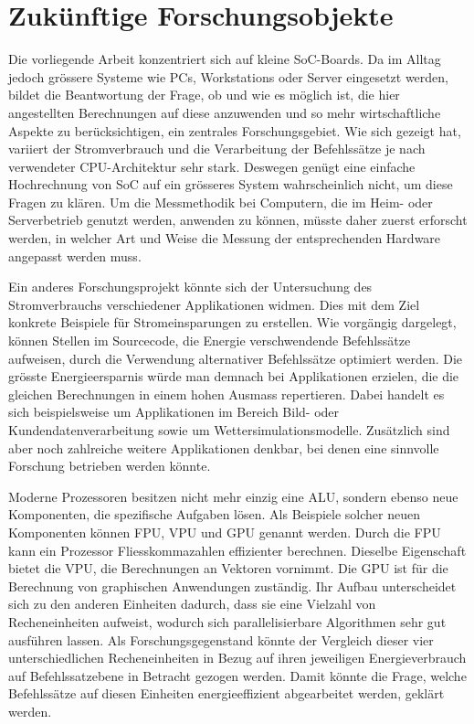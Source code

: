 \section{Zukünftige Forschungsobjekte}
Die vorliegende Arbeit konzentriert sich auf kleine SoC-Boards. Da im Alltag jedoch grössere Systeme wie PCs, Workstations oder Server eingesetzt werden, bildet die Beantwortung der Frage, ob und wie es möglich ist, die hier angestellten Berechnungen auf diese anzuwenden und so mehr wirtschaftliche Aspekte zu berücksichtigen, ein zentrales Forschungsgebiet. Wie sich gezeigt hat, variiert der Stromverbrauch und die Verarbeitung der Befehlssätze je nach verwendeter CPU-Architektur sehr stark. Deswegen genügt eine einfache Hochrechnung von SoC auf ein grösseres System wahrscheinlich nicht, um diese Fragen zu klären. Um die Messmethodik bei Computern, die im Heim- oder Serverbetrieb genutzt werden, anwenden zu können, müsste daher zuerst erforscht werden, in welcher Art und Weise die Messung der entsprechenden Hardware angepasst werden muss.
\par
Ein anderes Forschungsprojekt könnte sich der Untersuchung des Stromverbrauchs verschiedener Applikationen widmen. Dies mit dem Ziel konkrete Beispiele für Stromeinsparungen zu erstellen. Wie vorgängig dargelegt, können Stellen im Sourcecode, die Energie verschwendende Befehlssätze aufweisen, durch die Verwendung alternativer Befehlssätze optimiert werden. Die grösste Energieersparnis würde man demnach bei Applikationen erzielen, die die gleichen Berechnungen in einem hohen Ausmass repertieren. Dabei handelt es sich beispielsweise um Applikationen im Bereich Bild- oder Kundendatenverarbeitung sowie um Wettersimulationsmodelle. Zusätzlich sind aber noch zahlreiche weitere Applikationen denkbar, bei denen eine sinnvolle Forschung betrieben werden könnte.
\par
Moderne Prozessoren besitzen nicht mehr einzig eine ALU, sondern ebenso neue Komponenten, die spezifische Aufgaben lösen. Als Beispiele solcher neuen Komponenten können FPU, VPU und GPU genannt werden. Durch die FPU kann ein Prozessor Fliesskommazahlen effizienter berechnen. Dieselbe Eigenschaft bietet die VPU, die Berechnungen an Vektoren vornimmt. Die GPU ist für die Berechnung von graphischen Anwendungen zuständig. Ihr Aufbau unterscheidet sich zu den anderen Einheiten dadurch, dass sie eine Vielzahl von Recheneinheiten aufweist, wodurch sich parallelisierbare Algorithmen sehr gut ausführen lassen. 
\newline Als Forschungsgegenstand könnte der Vergleich dieser vier unterschiedlichen Recheneinheiten in Bezug auf ihren jeweiligen Energieverbrauch auf Befehlssatzebene in Betracht gezogen werden. Damit könnte die Frage, welche Befehlssätze auf diesen Einheiten energieeffizient abgearbeitet werden, geklärt werden.


